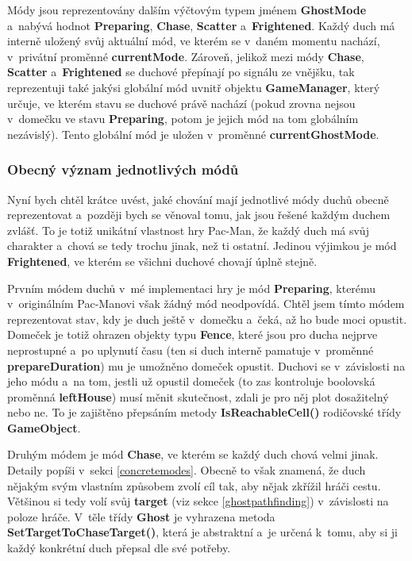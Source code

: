 \documentclass{article}
\begin{document}
Módy jsou reprezentovány dalším výčtovým typem jménem \textbf{GhostMode} a~nabývá hodnot \textbf{Preparing}, \textbf{Chase}, \textbf{Scatter} a~\textbf{Frightened}. Každý duch má interně uložený svůj aktuální mód, ve kterém se v~daném momentu nachází, v~privátní proměnné \textbf{currentMode}. Zároveň, jelikož mezi módy \textbf{Chase}, \textbf{Scatter} a~\textbf{Frightened} se duchové přepínají po signálu ze vnějšku, tak reprezentuji také jakýsi globální mód uvnitř objektu \textbf{GameManager}, který určuje, ve kterém stavu se duchové právě nachází (pokud zrovna nejsou v~domečku ve stavu \textbf{Preparing}, potom je jejich mód na tom globálním nezávislý). Tento globální mód je uložen v~proměnné \textbf{currentGhostMode}.

\subsubsection{Obecný význam jednotlivých módů} \label{modemeaning}
Nyní bych chtěl krátce uvést, jaké chování mají jednotlivé módy duchů obecně reprezentovat a~později bych se věnoval tomu, jak jsou řešené každým duchem zvlášť. To je totiž unikátní vlastnost hry Pac-Man, že každý duch má svůj charakter a~chová se tedy trochu jinak, než ti ostatní. Jedinou výjimkou je mód \textbf{Frightened}, ve kterém se všichni duchové chovají úplně stejně.

Prvním módem duchů v~mé implementaci hry je mód \textbf{Preparing}, kterému v~originálním Pac-Manovi však žádný mód neodpovídá. Chtěl jsem tímto módem reprezentovat stav, kdy je duch ještě v~domečku a~čeká, až ho bude moci opustit. Domeček je totiž ohrazen objekty typu \textbf{Fence}, které jsou pro ducha nejprve neprostupné a~po uplynutí času (ten si duch interně pamatuje v~proměnné \textbf{prepareDuration}) mu je umožněno domeček opustit. Duchovi se v~závislosti na jeho módu a~na tom, jestli už opustil domeček (to zas kontroluje boolovská proměnná \textbf{leftHouse}) musí měnit skutečnost, zdali je pro něj plot dosažitelný nebo ne. To je zajištěno přepsáním metody \textbf{IsReachableCell()} rodičovské třídy \textbf{GameObject}.

Druhým módem je mód \textbf{Chase}, ve kterém se každý duch chová velmi jinak. Detaily popíši v~sekci \ref{concretemodes}. Obecně to však znamená, že duch nějakým svým vlastním způsobem zvolí cíl tak, aby nějak zkřížil hráči cestu. Většinou si tedy volí svůj \textbf{target} (viz sekce \ref{ghostpathfinding}) v~závislosti na poloze hráče. V~těle třídy \textbf{Ghost} je vyhrazena metoda \textbf{SetTargetToChaseTarget()}, která je abstraktní a~je určená k~tomu, aby si ji každý konkrétní duch přepsal dle své potřeby.
\end{document}
